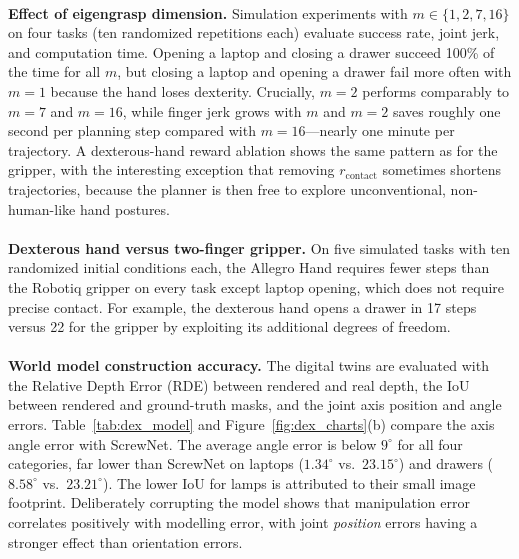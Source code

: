 \documentclass[12pt,a4paper,final]{extreport}
\begin{document}
\paragraph{} \textbf{Effect of eigengrasp dimension.} Simulation experiments with $m\in\{1,2,7,16\}$ on four tasks (ten randomized repetitions each) evaluate success rate, joint jerk, and computation time. Opening a laptop and closing a drawer succeed 100\% of the time for all $m$, but closing a laptop and opening a drawer fail more often with $m=1$ because the hand loses dexterity. Crucially, $m=2$ performs comparably to $m=7$ and $m=16$, while finger jerk grows with $m$ and $m=2$ saves roughly one second per planning step compared with $m=16$---nearly one minute per trajectory. A dexterous-hand reward ablation shows the same pattern as for the gripper, with the interesting exception that removing $r_{\mathrm{contact}}$ sometimes shortens trajectories, because the planner is then free to explore unconventional, non-human-like hand postures.

\paragraph{} \textbf{Dexterous hand versus two-finger gripper.} On five simulated tasks with ten randomized initial conditions each, the Allegro Hand requires fewer steps than the Robotiq gripper on every task except laptop opening, which does not require precise contact. For example, the dexterous hand opens a drawer in 17 steps versus 22 for the gripper by exploiting its additional degrees of freedom.

\paragraph{} \textbf{World model construction accuracy.} The digital twins are evaluated with the Relative Depth Error (RDE) between rendered and real depth, the IoU between rendered and ground-truth masks, and the joint axis position and angle errors. Table~\ref{tab:dex_model} and Figure~\ref{fig:dex_charts}(b) compare the axis angle error with ScrewNet. The average angle error is below $9^{\circ}$ for all four categories, far lower than ScrewNet on laptops ($1.34^{\circ}$ vs.\ $23.15^{\circ}$) and drawers ($8.58^{\circ}$ vs.\ $23.21^{\circ}$). The lower IoU for lamps is attributed to their small image footprint. Deliberately corrupting the model shows that manipulation error correlates positively with modelling error, with joint \emph{position} errors having a stronger effect than orientation errors.
\end{document}
